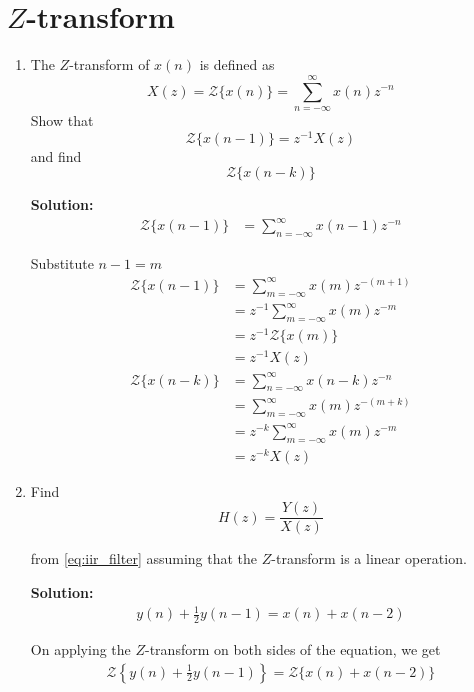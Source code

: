 \documentclass[journal,12pt,twocolumn]{IEEEtran}
\newcommand{\solution}{\noindent \textbf{Solution: }}
\providecommand{\cbrak}[1]{\ensuremath{\left\{#1\right\}}}
\numberwithin{equation}{section}
\renewcommand\thesection{\arabic{section}}
\begin{document}
	\section{$Z$-transform}
	\begin{enumerate}[label=\thesection.\arabic*]
	\item The $Z$-transform of $x(n)$ is defined as
	\begin{equation}
		\label{eq:z_trans}
		X(z)={\mathcal {Z}}\{x(n)\}=\sum _{n=-\infty }^{\infty }x(n)z^{-n}
	\end{equation}
	Show that
	\begin{equation}
		\label{eq:shift1}
		{\mathcal {Z}}\{x(n-1)\} = z^{-1}X(z)
	\end{equation}
	and find
	\begin{equation}
		{\mathcal {Z}}\{x(n-k)\} 
	\end{equation}
	
	\solution 
	\begin{align}
		{\mathcal {Z}}\{x(n-1)\} &= \sum _{n=-\infty }^{\infty }x(n - 1)z^{-n} 
	\end{align}
	
	Substitute $n - 1 = m$
	\begin{align}
		{\mathcal {Z}}\{x(n-1)\} &=  \sum _{m=-\infty }^{\infty }x(m)z^{-(m+1)} \\
		&= z^{-1} \sum _{m=-\infty }^{\infty }x(m)z^{-m} \\
		&= z^{-1} {\mathcal {Z}}\{x(m)\} \\	
		&= z^{-1} X(z) \\
		{\mathcal {Z}}\{x(n-k)\} &=  \sum _{n=-\infty }^{\infty }x(n - k)z^{-n} \\
		&=  \sum _{m=-\infty }^{\infty }x(m)z^{-(m+k)} \\
		&= z^{-k} \sum _{m=-\infty }^{\infty }x(m)z^{-m} \\
		&= z^{-k} X(z)
	\end{align}	
	
	\item Find
	\begin{equation}
		H(z) = \frac{Y(z)}{X(z)}
	\end{equation}

	from  \eqref{eq:iir_filter} assuming that the $Z$-transform is a linear operation.

	\solution 
	\begin{align}
		y(n) + \frac{1}{2}y(n-1) = x(n) + x(n-2)
	\end{align}
	
	On applying the $Z$-transform on both sides of the equation, we get
	\begin{align}
		{\mathcal {Z}}\cbrak{y(n) + \frac{1}{2}y(n-1)} = {\mathcal {Z}}\{x(n) + x(n-2)\}
	\end{align}
	

\end{enumerate}
\end{document}
